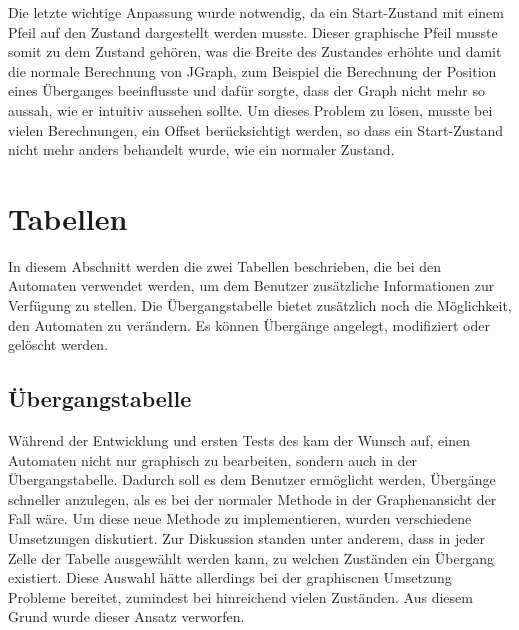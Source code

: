 Die letzte wichtige Anpassung wurde notwendig, da ein Start-Zustand mit einem
Pfeil auf den Zustand dargestellt werden musste. Dieser graphische Pfeil musste
somit zu dem Zustand gehören, was die Breite des Zustandes erhöhte und damit die
normale Berechnung von JGraph, zum Beispiel die Berechnung der Position eines
Überganges beeinflusste und dafür sorgte, dass der Graph nicht mehr so aussah,
wie er intuitiv aussehen sollte. Um dieses Problem zu lösen, musste bei vielen
Berechnungen, ein Offset berücksichtigt werden, so dass ein Start-Zustand nicht
mehr anders behandelt wurde, wie ein normaler Zustand.\vspace{10pt}


\section{Tabellen}\label{Tables}

In diesem Abschnitt werden die zwei Tabellen beschrieben, die bei den Automaten
verwendet werden, um dem Benutzer zusätzliche Informationen zur Verfügung zu
stellen. Die Übergangstabelle bietet zusätzlich noch die Möglichkeit, den
Automaten zu verändern. Es können Übergänge angelegt, modifiziert oder gelöscht
werden.\vspace{10pt}


\subsection{Übergangstabelle}\label{TablesTransition}

Während der Entwicklung und ersten Tests des \gtitools kam der Wunsch auf, einen
Automaten nicht nur graphisch zu bearbeiten, sondern auch in der
Übergangstabelle. Dadurch soll es dem Benutzer ermöglicht werden, Übergänge
schneller anzulegen, als es bei der normaler Methode in der Graphenansicht der
Fall wäre. Um diese neue Methode zu implementieren, wurden verschiedene
Umsetzungen diskutiert. Zur Diskussion standen unter anderem, dass in jeder Zelle
der Tabelle ausgewählt werden kann, zu welchen Zuständen ein Übergang existiert.
Diese Auswahl hätte allerdings bei der graphiscnen Umsetzung Probleme bereitet,
zumindest bei hinreichend vielen Zuständen. Aus diesem Grund wurde dieser Ansatz
verworfen.\vspace{10pt}

